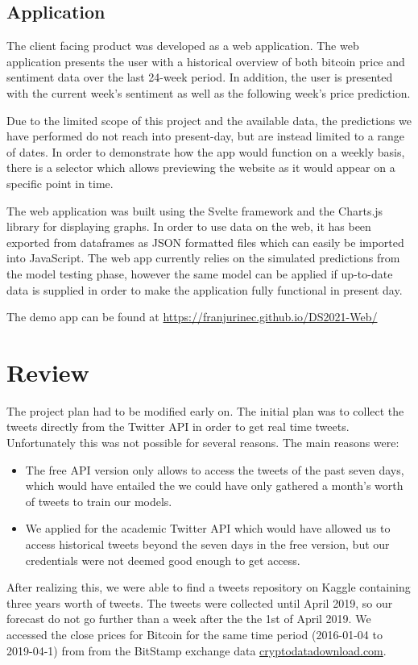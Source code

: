 \documentclass{article}
\begin{document}
\subsection{Application}
The client facing product was developed as a web application. The web application presents the user with a historical overview of both bitcoin price and sentiment data over the last 24-week period. In addition, the user is presented with the current week's sentiment as well as the following week's price prediction.

Due to the limited scope of this project and the available data, the predictions we have performed do not reach into present-day, but are instead limited to a range of dates. In order to demonstrate how the app would function on a weekly basis, there is a selector which allows previewing the website as it would appear on a specific point in time.

The web application was built using the Svelte framework and the Charts.js library for displaying graphs. In order to use data on the web, it has been exported from dataframes as JSON formatted files which can easily be imported into JavaScript. The web app currently relies on the simulated predictions from the model testing phase, however the same model can be applied if up-to-date data is supplied in order to make the application fully functional in present day.

The demo app can be found at \url{https://franjurinec.github.io/DS2021-Web/}

\section{Review}
The project plan had to be modified early on. The initial plan was to collect the tweets directly from the Twitter API in order to get real time tweets. Unfortunately this was not possible for several reasons. The main reasons were: 
\begin{itemize}
    \item The free API version only allows to access the tweets of the past seven days, which would have entailed the we could have only gathered a month's worth of tweets to train our models.
    \item We applied for the academic Twitter API which would have allowed us to access historical tweets beyond the seven days in the free version, but our credentials were not deemed good enough to get access. 
\end{itemize}
After realizing this, we were able to find a tweets repository on Kaggle containing three years worth of tweets. The tweets were collected until April 2019, so our forecast do not go further than a week after the the 1st of April 2019. We accessed the close prices for Bitcoin for the same time period (2016-01-04 to 2019-04-1) from from the BitStamp exchange data \url{cryptodatadownload.com}. 
\end{document}
